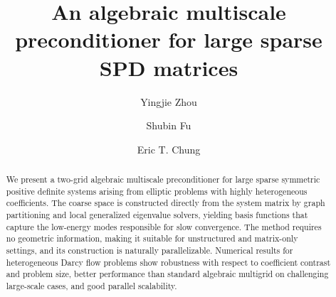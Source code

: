 \documentclass[preprint,12pt]{elsarticle}
\begin{document}
  \begin{frontmatter}
    \title{An algebraic multiscale preconditioner for large sparse SPD matrices}


    \author[CHUK]{Yingjie Zhou}

    \author[EIAS]{Shubin Fu}
     

    \author[CUHK]{Eric T. Chung}







    \begin{abstract}
          We present a two-grid algebraic multiscale preconditioner for large sparse symmetric
    positive definite systems arising from elliptic problems with highly heterogeneous
    coefficients. The coarse space is constructed directly from the system
    matrix by graph partitioning and local generalized eigenvalue solvers, yielding
    basis functions that capture the low-energy modes responsible for slow convergence.
    The method requires no geometric information, making it suitable for unstructured
    and matrix-only settings, and its construction is naturally parallelizable. Numerical
    results for heterogeneous Darcy flow problems show robustness with respect to
    coefficient contrast and problem size, better performance than standard
    algebraic multigrid on challenging large-scale cases, and good parallel scalability.
    \end{abstract}


\end{frontmatter}
\end{document}
